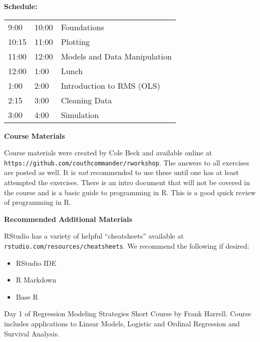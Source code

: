 \documentclass[twocolumn]{article}
\begin{document}
\begin{flushleft}

\vspace*{0.5cm}

\textbf{Schedule:}

\begin{tabular}[H]{lll}
9:00 & 10:00  & Foundations \\
10:15 & 11:00 & Plotting \\
11:00 & 12:00 & Models and Data Manipulation \\
12:00 & 1:00  & Lunch \\
1:00  & 2:00  & Introduction to RMS (OLS) \\
2:15  & 3:00  & Cleaning Data \\
3:00  & 4:00  & Simulation \\
\end{tabular}

\vspace*{\fill}

\textbf{Course Materials}

Course materials were created by Cole Beck and available online at
\texttt{https://github.com/couthcommander/rworkshop}. The answers to
all exercises are posted as well. It is \emph{not} recommended to use
these until one has at least attempted the exercises. There is an intro document that will not be covered in the course and is a basic guide to programming in R. This is a good quick review of programming in R.


\vspace*{\fill}

\textbf{Recommended Additional Materials}

RStudio has a variety of helpful ``cheatsheets'' available at \texttt{rstudio.com/resources/cheatsheets}. We recommend the following if desired:

\begin{itemize}
\item RStudio IDE
\item R Markdown
\item Base R
\end{itemize}

\vspace*{\fill}

Day 1 of Regression Modeling Strategies Short Course by Frank Harrell. Course includes applications to Linear Models, Logistic and Ordinal Regression and Survival Analysis.

\end{flushleft}
\end{document}
